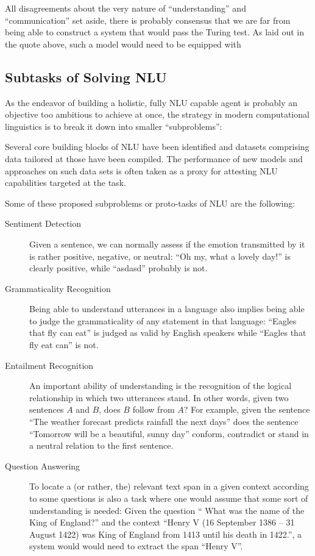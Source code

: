 All disagreements about the very nature of ``understanding'' and ``communication'' set aside,
there is probably consensus that we are far from being able to construct a system that
would pass the Turing test.
As laid out in the quote above, such a model would need
to be equipped with



\subsection{Subtasks of Solving NLU}

As the endeavor of building a holistic, fully NLU capable agent is probably an objective too
ambitious to achieve at once, the strategy in modern computational linguistics is to break it
down into smaller ``subproblems'':

Several core building blocks of NLU have been identified and datasets comprising data  tailored at those
have been compiled. The performance of new models and approaches on such data sets is often taken as
a proxy for attesting NLU capabilities targeted at the task.

Some of these proposed subproblems or proto-tasks of NLU are the following:

\begin{description}
  \item[Sentiment Detection] Given a sentence, we can normally assess if the emotion transmitted by
      it is rather positive, negative, or neutral: ``Oh my, what a lovely day!'' is clearly positive,
      while  ``asdasd'' probably is not.
  \item[Grammaticality Recognition] Being able to understand utterances in a language also implies
      being able to judge the grammaticality of any statement in that language: ``Eagles that fly can
      eat'' is judged as valid by English speakers while ``Eagles that fly eat can'' is not.
  \item[Entailment Recognition] An important ability of understanding is the recognition of the
      logical relationship in which two utterances stand. In other words, given two sentences $A$ and
      $B$, does $B$ follow from $A$? For example, given the sentence ``The weather forecast predicts
      rainfall the next days'' does the sentence ``Tomorrow will be a beautiful, sunny day'' conform,
      contradict or stand in a neutral relation to the first sentence.
  \item[Question Answering] To locate a (or rather, the) relevant text span in a given context according to some
      questions is also a task where one would assume that some sort of understanding is needed:
      Given the question `` What was the name of the King of England?'' and the context ``Henry
      V (16 September 1386 – 31 August 1422) was King of England from 1413 until his death in
      1422.'', a system would would need to extract the span ``Henry V''.
\end{description}

